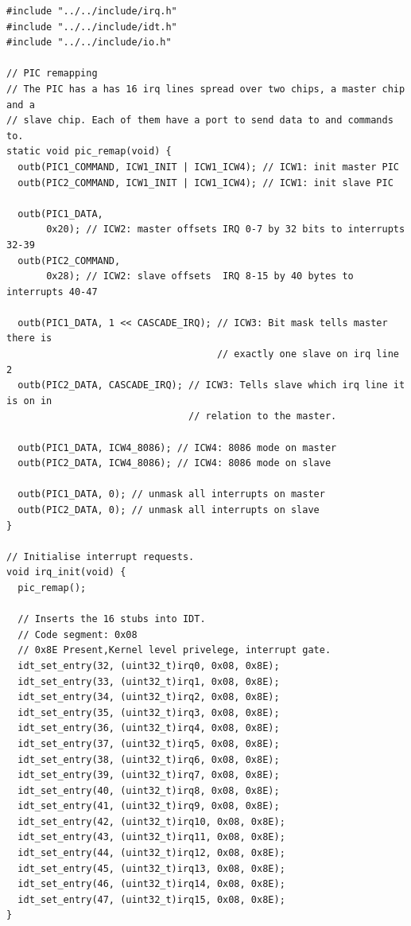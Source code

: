 \documentclass[../main.tex]{subfiles}
\begin{document}
\label{lst:irq_c}
\begin{verbatim}
#include "../../include/irq.h"
#include "../../include/idt.h"
#include "../../include/io.h"

// PIC remapping
// The PIC has a has 16 irq lines spread over two chips, a master chip and a
// slave chip. Each of them have a port to send data to and commands to.
static void pic_remap(void) {
  outb(PIC1_COMMAND, ICW1_INIT | ICW1_ICW4); // ICW1: init master PIC
  outb(PIC2_COMMAND, ICW1_INIT | ICW1_ICW4); // ICW1: init slave PIC

  outb(PIC1_DATA,
       0x20); // ICW2: master offsets IRQ 0-7 by 32 bits to interrupts 32-39
  outb(PIC2_COMMAND,
       0x28); // ICW2: slave offsets  IRQ 8-15 by 40 bytes to interrupts 40-47

  outb(PIC1_DATA, 1 << CASCADE_IRQ); // ICW3: Bit mask tells master there is
                                     // exactly one slave on irq line 2
  outb(PIC2_DATA, CASCADE_IRQ); // ICW3: Tells slave which irq line it is on in
                                // relation to the master.

  outb(PIC1_DATA, ICW4_8086); // ICW4: 8086 mode on master
  outb(PIC2_DATA, ICW4_8086); // ICW4: 8086 mode on slave

  outb(PIC1_DATA, 0); // unmask all interrupts on master
  outb(PIC2_DATA, 0); // unmask all interrupts on slave
}

// Initialise interrupt requests.
void irq_init(void) {
  pic_remap();

  // Inserts the 16 stubs into IDT.
  // Code segment: 0x08
  // 0x8E Present,Kernel level privelege, interrupt gate.
  idt_set_entry(32, (uint32_t)irq0, 0x08, 0x8E);
  idt_set_entry(33, (uint32_t)irq1, 0x08, 0x8E);
  idt_set_entry(34, (uint32_t)irq2, 0x08, 0x8E);
  idt_set_entry(35, (uint32_t)irq3, 0x08, 0x8E);
  idt_set_entry(36, (uint32_t)irq4, 0x08, 0x8E);
  idt_set_entry(37, (uint32_t)irq5, 0x08, 0x8E);
  idt_set_entry(38, (uint32_t)irq6, 0x08, 0x8E);
  idt_set_entry(39, (uint32_t)irq7, 0x08, 0x8E);
  idt_set_entry(40, (uint32_t)irq8, 0x08, 0x8E);
  idt_set_entry(41, (uint32_t)irq9, 0x08, 0x8E);
  idt_set_entry(42, (uint32_t)irq10, 0x08, 0x8E);
  idt_set_entry(43, (uint32_t)irq11, 0x08, 0x8E);
  idt_set_entry(44, (uint32_t)irq12, 0x08, 0x8E);
  idt_set_entry(45, (uint32_t)irq13, 0x08, 0x8E);
  idt_set_entry(46, (uint32_t)irq14, 0x08, 0x8E);
  idt_set_entry(47, (uint32_t)irq15, 0x08, 0x8E);
}


\end{verbatim}
\end{document}
